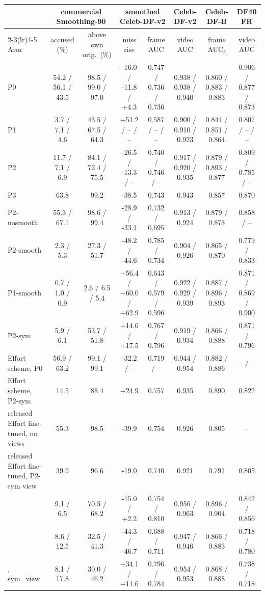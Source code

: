 \begin{tabular}{@{}l cc cc c c c@{}}
\toprule
 & \multicolumn{2}{c}{commercial Smoothing-90} & \multicolumn{2}{c}{smoothed Celeb-DF-v2} & Celeb-DF-v2 & Celeb-DF-B & DF40 FR \\
\cmidrule(lr){2-3}\cmidrule(lr){4-5}
Arm & accused (\%) & above own orig.\ (\%) & miss rise & frame AUC & video AUC & frame AUC$_b$ & video AUC \\
\midrule
P0 & 54.2 / 56.1 / 43.5 & 98.5 / 99.0 / 97.0 & -16.0 / -11.8 / +4.3 & 0.747 / 0.736 / 0.736 & 0.938 / 0.938 / 0.940 & 0.860 / 0.883 / 0.883 & 0.906 / 0.877 / 0.873 \\
P1 & 3.7 / 7.1 / 4.6 & 43.5 / 67.5 / 64.3 & +51.2 / -- / -- & 0.587 / -- / -- & 0.900 / 0.910 / 0.923 & 0.844 / 0.851 / 0.864 & 0.807 / -- / -- \\
P2 & 11.7 / 7.1 / 6.9 & 84.1 / 72.4 / 75.5 & -26.5 / -13.3 / -- & 0.740 / 0.746 / -- & 0.917 / 0.920 / 0.935 & 0.879 / 0.893 / 0.877 & 0.809 / 0.785 / -- \\
P3 & 63.8 & 99.2 & -38.5 & 0.743 & 0.943 & 0.857 & 0.870 \\
P2-nosmooth & 55.3 / 67.1 & 98.6 / 99.4 & -28.9 / -33.1 & 0.732 / 0.695 & 0.913 / 0.924 & 0.879 / 0.873 & 0.858 / -- \\
P2-smooth & 2.3 / 5.3 & 27.3 / 51.7 & -48.2 / -44.6 & 0.785 / 0.734 & 0.904 / 0.926 & 0.865 / 0.870 & 0.779 / 0.833 \\
P1-smooth & 0.7 / 1.0 / 0.9 & 2.6 / 6.5 / 5.4 & +56.4 / +60.0 / +62.9 & 0.643 / 0.579 / 0.596 & 0.922 / 0.929 / 0.939 & 0.887 / 0.896 / 0.893 & 0.871 / 0.869 / 0.900 \\
P2-sym & 5.9 / 6.1 & 53.7 / 51.8 & +14.6 / +17.5 & 0.767 / 0.796 & 0.919 / 0.934 & 0.866 / 0.888 & 0.871 / 0.796 \\
Effort scheme, P0 & 56.9 / 63.2 & 99.1 / 99.1 & -32.2 / -- & 0.719 / -- & 0.944 / 0.954 & 0.882 / 0.886 & -- / -- \\
Effort scheme, P2-sym & 14.5 & 88.4 & +24.9 & 0.757 & 0.935 & 0.890 & 0.822 \\
released Effort fine-tuned, no views & 55.3 & 98.5 & -39.9 & 0.754 & 0.926 & 0.805 & -- \\
released Effort fine-tuned, P2-sym view & 39.9 & 96.6 & -19.0 & 0.740 & 0.921 & 0.791 & 0.805 \\
\oursB{} & 9.1 / 6.5 & 70.5 / 68.2 & -15.0 / +2.2 & 0.754 / 0.810 & 0.956 / 0.963 & 0.896 / 0.904 & 0.842 / 0.856 \\
\oursF{} & 8.6 / 12.5 & 32.5 / 41.3 & -44.3 / -46.7 & 0.688 / 0.711 & 0.947 / 0.946 & 0.866 / 0.883 & 0.718 / 0.780 \\
\oursF{}, sym.\ view & 8.1 / 17.8 & 30.0 / 46.2 & +34.1 / +11.6 & 0.796 / 0.784 & 0.954 / 0.953 & 0.868 / 0.888 & 0.738 / 0.718 \\
\bottomrule
\end{tabular}

